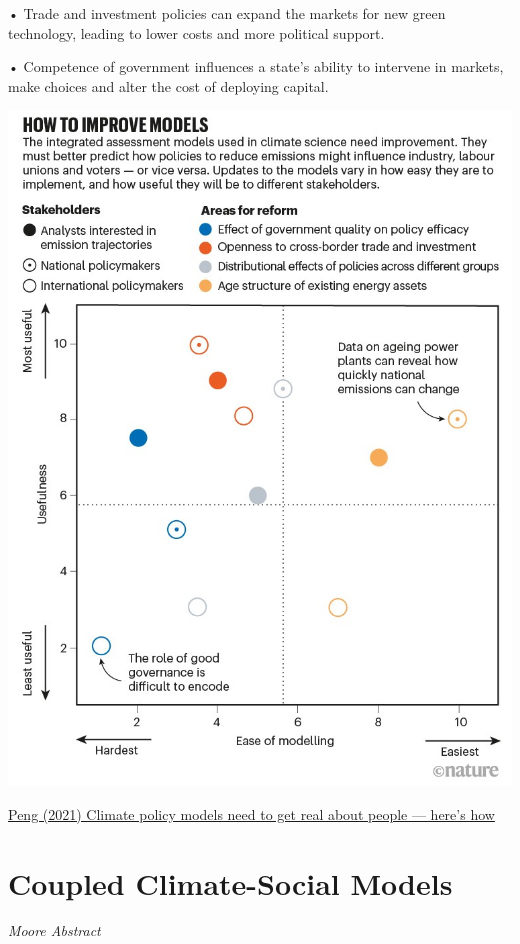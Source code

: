 \documentclass[
]{book}
\begin{document}
• Trade and investment policies can expand the markets for new green technology, leading to lower costs and more political support.

• Competence of government influences a state's ability to intervene in markets, make choices and alter the cost of deploying capital.

\includegraphics{fig/political_IAM.jpg}

\href{https://www.nature.com/articles/d41586-021-01500-2}{Peng (2021) Climate policy models need to get real about people --- here's how}

\hypertarget{coupled-climate-social-models}{%
\section{Coupled Climate-Social Models}\label{coupled-climate-social-models}}

\emph{Moore Abstract}
\end{document}
